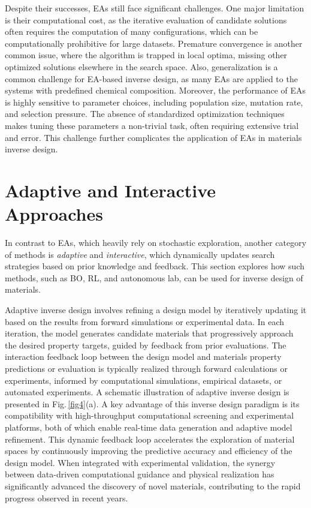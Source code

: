 \documentclass[fleqn,10pt]{wlscirep}
\begin{document}
Despite their successes, EAs still face significant challenges. One major limitation is their computational cost, as the iterative evaluation of candidate solutions often requires the computation of many configurations, which can be computationally prohibitive for large datasets. Premature convergence is another common issue, where the algorithm is trapped in local optima, missing other optimized solutions elsewhere in the search space. Also, generalization is a common challenge for EA-based inverse design, as many EAs are applied to the systems with predefined chemical composition. Moreover, the performance of EAs is highly sensitive to parameter choices, including population size, mutation rate, and selection pressure. The absence of standardized optimization techniques makes tuning these parameters a non-trivial task, often requiring extensive trial and error. This challenge further complicates the application of EAs in materials inverse design.


\section{Adaptive and Interactive Approaches}\label{rl}
In contrast to EAs, which heavily rely on stochastic exploration, another category of methods is
\textit{adaptive} and \textit{interactive}, which dynamically 
 updates search strategies based on prior knowledge and feedback. This section explores how such methods, such as BO, RL, and autonomous lab, can be used for inverse design of materials. 
 
Adaptive inverse design involves refining a design model by iteratively updating it based on the results from forward simulations or experimental data. In each iteration, the model generates candidate materials that progressively approach the desired property targets, guided by feedback from prior evaluations. The interaction feedback loop between the design model and materials property predictions or evaluation is typically realized through forward calculations or experiments, informed by computational simulations, empirical datasets, or automated experiments. A schematic illustration of adaptive inverse design is presented in Fig.\,\ref{fig4}(a).
A key advantage of this inverse design paradigm is its compatibility with high-throughput computational screening and experimental platforms, both of which enable real-time data generation and adaptive model refinement. This dynamic feedback loop accelerates the exploration of material spaces by continuously improving the predictive accuracy and efficiency of the design model. When integrated with experimental validation, the synergy between data-driven computational guidance and physical realization has significantly advanced the discovery of novel materials, contributing to the rapid progress observed in recent years.
\end{document}
